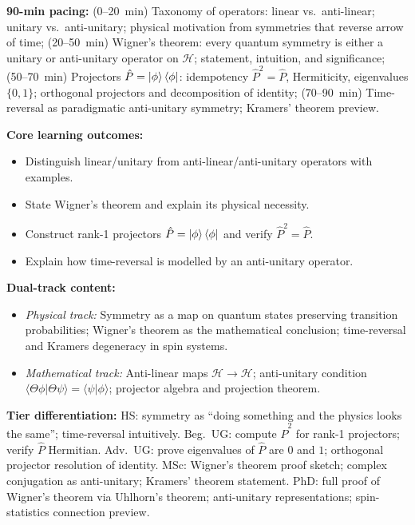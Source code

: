 \documentclass[11pt,a4paper]{article}
\begin{document}
\begin{tcolorbox}[modulebox, title={Module~I.1 / L05: Types of Symmetry Operators and Wigner's Theorem}]
\textbf{90-min pacing:} (0--20~min) Taxonomy of operators: linear vs.\ anti-linear;
unitary vs.\ anti-unitary; physical motivation from symmetries that reverse arrow of time;
(20--50~min) Wigner's theorem: every quantum symmetry is either a unitary or anti-unitary operator
on $\mathcal{H}$; statement, intuition, and significance;
(50--70~min) Projectors $\hat{P} = \ket{\phi}\bra{\phi}$: idempotency $\hat{P}^2=\hat{P}$,
Hermiticity, eigenvalues $\{0,1\}$; orthogonal projectors and decomposition of identity;
(70--90~min) Time-reversal as paradigmatic anti-unitary symmetry; Kramers' theorem preview.

\medskip\textbf{Core learning outcomes:}
\begin{itemize}[leftmargin=1.4em,topsep=2pt,itemsep=1pt]
  \item Distinguish linear/unitary from anti-linear/anti-unitary operators with examples.
  \item State Wigner's theorem and explain its physical necessity.
  \item Construct rank-1 projectors $\hat{P}=\ket{\phi}\bra{\phi}$ and verify $\hat{P}^2=\hat{P}$.
  \item Explain how time-reversal is modelled by an anti-unitary operator.
\end{itemize}

\medskip\textbf{Dual-track content:}
\begin{itemize}[leftmargin=1.4em,topsep=2pt,itemsep=1pt]
  \item \textit{Physical track:} Symmetry as a map on quantum states preserving transition probabilities;
    Wigner's theorem as the mathematical conclusion; time-reversal and Kramers degeneracy in spin systems.
  \item \textit{Mathematical track:} Anti-linear maps $\mathcal{H}\to\mathcal{H}$;
    anti-unitary condition $\langle\Theta\phi|\Theta\psi\rangle = \langle\psi|\phi\rangle$;
    projector algebra and projection theorem.
\end{itemize}

\medskip\textbf{Tier differentiation:}
HS: symmetry as ``doing something and the physics looks the same''; time-reversal intuitively.
Beg.\ UG: compute $\hat{P}^2$ for rank-1 projectors; verify $\hat{P}$ Hermitian.
Adv.\ UG: prove eigenvalues of $\hat{P}$ are $0$ and $1$; orthogonal projector resolution of identity.
MSc: Wigner's theorem proof sketch; complex conjugation as anti-unitary; Kramers' theorem statement.
PhD: full proof of Wigner's theorem via Uhlhorn's theorem; anti-unitary representations; spin-statistics connection preview.


\end{tcolorbox}
\end{document}
